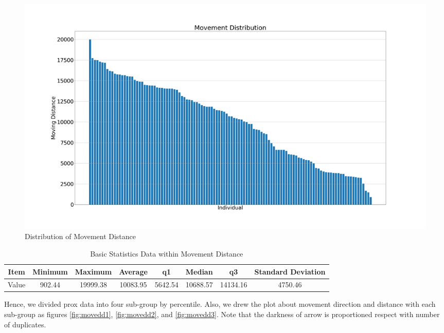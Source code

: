 \documentclass[aps, 10pt, a4paper]{article}
\begin{document}
            \begin{figure}[htbp]
                \centering
                \includegraphics[width=0.6 \linewidth]{figures/movementdistribution.png}
                \caption{Distribution of Movement Distance}
                \label{fig:movementdist}
            \end{figure}
        
            \begin{table}[htbp]
                \centering
                \caption{Basic Statistics Data within Movement Distance}
                \label{tb:movementdist}
                \begin{tabular}{c||c|c|c|c|c|c|c}
                    Item & Minimum & Maximum & Average & q1 & Median & q3 & Standard Deviation \\ \hline
                    Value & 902.44 & 19999.38 & 10083.95 & 5642.54 & 10688.57 & 14134.16 & 4750.46 \\
                \end{tabular}
            \end{table}
        
            Hence, we divided prox data into four sub-group by percentile. Also, we drew the plot about movement direction and distance with each sub-group as figures \ref{fig:movedd1}, \ref{fig:movedd2}, and \ref{fig:movedd3}. Note that the darkness of arrow is proportioned respect with number of duplicates. 
            
\end{document}
